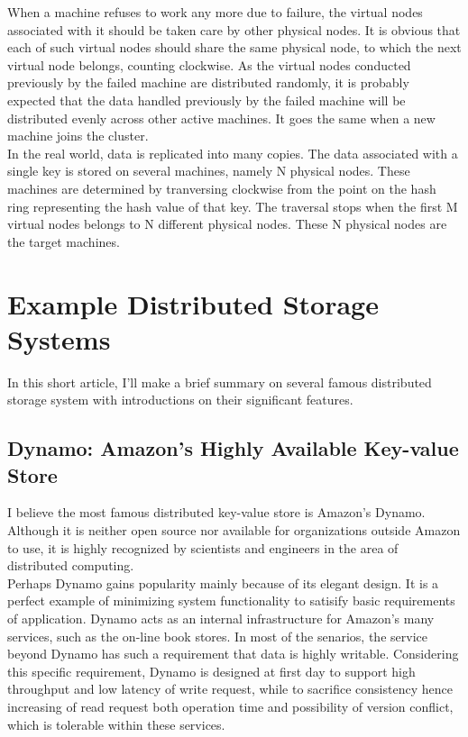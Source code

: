 \documentclass{article}
\begin{document}
When a machine refuses to work any more due to failure, the virtual nodes
associated with it should be taken care by other physical nodes. It is obvious
that each of such virtual nodes should share the same physical node, to which
the next virtual node belongs, counting clockwise. As the virtual nodes
conducted previously by the failed machine are distributed randomly, it is
probably expected that the data handled previously by the failed machine will
be distributed evenly across other active machines. It goes the same when a
new machine joins the cluster.\\

In the real world, data is replicated into many copies. The data associated
with a single key is stored on several machines, namely N physical nodes.
These machines are determined by tranversing clockwise from the point on the
hash ring representing the hash value of that key. The traversal stops when
the first M virtual nodes belongs to N different physical nodes. These N
physical nodes are the target machines.

\section{Example Distributed Storage Systems}
In this short article, I'll make a brief summary on several famous distributed
storage system with introductions on their significant features.

\subsection{Dynamo: Amazon's Highly Available Key-value Store}
I believe the most famous distributed key-value store is Amazon's
Dynamo\cite{decandia2007dynamo}. Although it is neither open source nor
available for organizations outside Amazon to use, it is highly recognized by
scientists and engineers in the area of distributed computing.\\

Perhaps Dynamo gains popularity mainly because of its elegant design. It is a
perfect example of minimizing system functionality to satisify basic
requirements of application. Dynamo acts as an internal infrastructure for
Amazon's many services, such as the on-line book stores. In most of the
senarios, the service beyond Dynamo has such a requirement that data is highly
writable. Considering this specific requirement, Dynamo is designed at first
day to support high throughput and low latency of write request, while to
sacrifice consistency hence increasing of read request both operation time and
possibility of version conflict, which is tolerable within these services.
\end{document}
